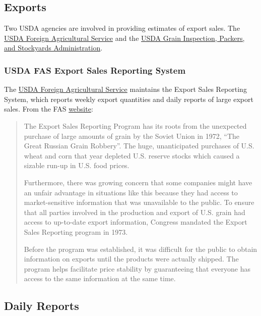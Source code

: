 \documentclass[
  letterpaper,
  DIV=11,
  numbers=noendperiod]{scrreprt}
\begin{document}
\hypertarget{exports-1}{%
\subsection{Exports}\label{exports-1}}

Two USDA agencies are involved in providing estimates of export sales.
The \href{http://www.fas.usda.gov/}{USDA Foreign Agricultural Service}
and the \href{http://www.gipsa.usda.gov/}{USDA Grain Inspection,
Packers, and Stockyards Administration}.

\hypertarget{usda-fas-export-sales-reporting-system}{%
\subsubsection{USDA FAS Export Sales Reporting
System}\label{usda-fas-export-sales-reporting-system}}

The \href{http://www.fas.usda.gov/}{USDA Foreign Agricultural Service}
maintains the Export Sales Reporting System, which reports weekly export
quantities and daily reports of large export sales. From the FAS
\href{https://apps.fas.usda.gov/export-sales/FACT\%20SHEET.pdf}{website}:

\begin{quote}
The Export Sales Reporting Program has its roots from the unexpected
purchase of large amounts of grain by the Soviet Union in 1972, ``The
Great Russian Grain Robbery''. The huge, unanticipated purchases of U.S.
wheat and corn that year depleted U.S. reserve stocks which caused a
sizable run-up in U.S. food prices.

Furthermore, there was growing concern that some companies might have an
unfair advantage in situations like this because they had access to
market-sensitive information that was unavailable to the public. To
ensure that all parties involved in the production and export of U.S.
grain had access to up-to-date export information, Congress mandated the
Export Sales Reporting program in 1973.

Before the program was established, it was difficult for the public to
obtain information on exports until the products were actually shipped.
The program helps facilitate price stability by guaranteeing that
everyone has access to the same information at the same time.
\end{quote}

\hypertarget{daily-reports}{%
\subsection{Daily Reports}\label{daily-reports}}
\end{document}
